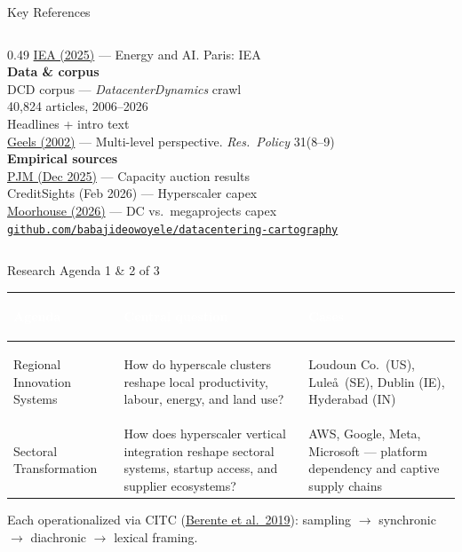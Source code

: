 \documentclass[aspectratio=169,11pt]{beamer}
\newcommand{\iconfull}[2]{\textcolor{#1}{\faIcon{#2}}}
\begin{document}
\begin{frame}[allowframebreaks]{\iconfull{dcblue}{book}\enspace Key References}
\begin{columns}[T]
\begin{column}{0.49\textwidth}
{\href{https://www.iea.org/reports/energy-and-ai}{IEA (2025)} — Energy and AI. Paris: IEA\\[0.4em]
\textbf{Data \& corpus}\\[0.3em]
DCD corpus — \textit{DatacenterDynamics} crawl\\
40,824 articles, 2006--2026\\
Headlines + intro text\\[0.2em]
\href{https://doi.org/10.1016/j.respol.2002.04.004}{Geels (2002)} — Multi-level perspective.
\textit{Res.\ Policy} 31(8--9)\\[0.4em]
\textbf{Empirical sources}\\[0.3em]
\href{https://www.pjm.com/}{PJM (Dec 2025)} — Capacity auction results\\[0.2em]
CreditSights (Feb 2026) — Hyperscaler capex\\[0.2em]
\href{https://x.com/finmoorhouse/status/2044933442236776794}{Moorhouse (2026)} — DC vs.\ megaprojects capex\\[0.2em]
\href{https://github.com/babajideowoyele/datacentering-cartography}{\texttt{github.com/babajideowoyele/datacentering-cartography}}
}
\end{column}
\end{columns}
\end{frame}

\appendix

\begin{frame}[noframenumbering]{\iconfull{dcblue}{map}\enspace Research Agenda 1 \& 2 of 3}
\vspace{0.3em}
{\footnotesize\setlength{\tabcolsep}{5pt}
\begin{tabularx}{\linewidth}{@{}>{\bfseries\raggedright}p{3cm}XX@{}}
\toprule
\rowcolor{black!88}
\textcolor{white}{\textbf{Agenda}} &
\textcolor{white}{\textbf{Central question}} &
\textcolor{white}{\textbf{Cases}} \\
\midrule
Regional Innovation Systems &
How do hyperscale clusters reshape local productivity, labour, energy, and land use? &
Loudoun Co.\ (US), Lule\aa\ (SE), Dublin (IE), Hyderabad (IN)\\[1em]
Sectoral Transformation &
How does hyperscaler vertical integration reshape sectoral systems, startup access, and supplier ecosystems? &
AWS, Google, Meta, Microsoft — platform dependency and captive supply chains\\[0.5em]
\bottomrule
\end{tabularx}}
\vspace{0.4em}
\footnotesize\textcolor{dcgray}{Each operationalized via CITC (\href{https://doi.org/10.1287/isre.2018.0774}{Berente et al.\ 2019}): sampling $\to$ synchronic $\to$ diachronic $\to$ lexical framing.}
\end{frame}
\end{document}
